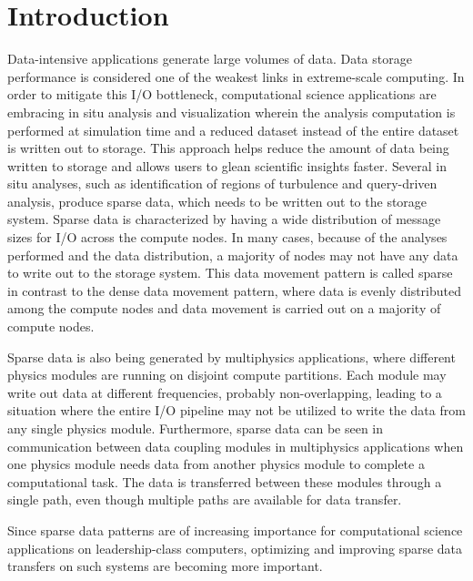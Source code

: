 \documentclass[final,5p,times]{elsarticle}
\begin{document}
\section{Introduction}
Data-intensive applications generate large volumes of data. Data storage  performance is considered one of the weakest links in extreme-scale computing. In order to mitigate this I/O bottleneck, computational science applications are embracing in situ analysis and visualization wherein the analysis computation is performed at simulation time and a reduced dataset instead of the entire dataset
is written out to storage.
This approach helps reduce the amount of data being written to storage and allows users to glean scientific insights faster. Several in situ analyses, such as identification of regions of turbulence and query-driven analysis, produce sparse data, which needs to be written out to the storage system.
Sparse data is characterized by having a wide distribution of message sizes for I/O across the compute nodes. In many cases,
because of the analyses performed and the data distribution,
a majority of nodes
may not have any data to write out to the storage system. This data movement pattern is called sparse in contrast to the dense data movement pattern, where data is evenly distributed among the compute nodes and data movement is carried out on a majority of compute nodes. 

Sparse data is also being generated by multiphysics applications, where different physics modules are running on disjoint compute partitions. Each module may write out data at different frequencies, probably non-overlapping, leading to a situation where the entire I/O pipeline may not be utilized to write the data from any single physics module. Furthermore, sparse data can be seen in communication between data coupling modules in multiphysics applications when one physics module needs data from another physics module to complete a computational task. The data is transferred between these modules through a single path, even though multiple paths are available for data transfer.

Since sparse data patterns are of increasing importance for computational science applications on leadership-class computers, optimizing and improving sparse data transfers on such systems are becoming more important.
\end{document}
